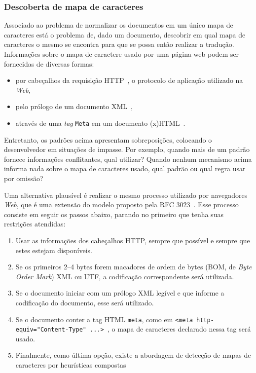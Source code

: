\documentclass[10pt,twocolumn]{article}
\begin{document}
\subsubsection{Descoberta de mapa de caracteres}

Associado ao problema de normalizar os documentos em um único mapa de
caracteres está o problema de, dado um documento, descobrir em qual mapa
de caracteres o mesmo se encontra para que se possa então realizar a
tradução. Informações sobre o mapa de caractere usado por uma página web
podem ser fornecidas de diversas formas:
\begin{itemize}
\item por cabeçalhos da requisição HTTP~\cite{rfc2616},
 o protocolo de aplicação utilizado na \emph{Web},
\item pelo prólogo de um documento XML~\cite{bray2006xml},
\item através de uma \emph{tag} \texttt{Meta} em um documento
(x)HTML~\cite{html4tr}.
\end{itemize}

Entretanto, os padrões acima apresentam sobreposições, colocando o
desenvolvedor em situações de impasse. Por exemplo, quando mais de um
padrão fornece informações conflitantes, qual utilizar?  Quando nenhum
mecanismo acima informa nada sobre o mapa de caracteres usado, qual
padrão ou qual regra usar por omissão?

%

Uma alternativa plausível é realizar o mesmo processo utilizado por
navegadores \emph{Web}, que é uma extensão do modelo proposto pela RFC
3023~\cite{rfc3023}. Esse processo consiste em seguir os passos abaixo,
parando no primeiro que tenha suas restrições atendidas:
\begin{enumerate}
\item Usar as informações dos cabeçalhos HTTP, sempre que possível e
sempre que estes estejam disponíveis.
\item  Se os primeiros 2--4 bytes forem macadores de ordem de bytes
(BOM, de \emph{Byte Order Mark}) XML ou UTF, a codificação
correspondente será utilizada.
\item Se o documento iniciar com um prólogo XML legível e que informe a
codificação do documento, esse será utilizado.
\item Se o documento conter a tag HTML \texttt{meta}, como em \texttt{<meta
http-equiv="Content-Type" ...> }, o mapa de caracteres declarado nessa
tag será usado.
\item Finalmente, como última opção, existe a abordagem de detecção de
mapas de caracteres por heurísticas compostas~\cite{mozillaiuc}
\end{enumerate}
\end{document}

